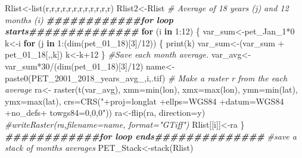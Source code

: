 \documentclass[
  10pt,
  b5paper,
]{book}
\newenvironment{Shaded}{\begin{snugshade}}{\end{snugshade}}
\newcommand{\AttributeTok}[1]{\textcolor[rgb]{0.77,0.63,0.00}{#1}}
\newcommand{\CommentTok}[1]{\textcolor[rgb]{0.56,0.35,0.01}{\textit{#1}}}
\newcommand{\ControlFlowTok}[1]{\textcolor[rgb]{0.13,0.29,0.53}{\textbf{#1}}}
\newcommand{\DecValTok}[1]{\textcolor[rgb]{0.00,0.00,0.81}{#1}}
\newcommand{\DocumentationTok}[1]{\textcolor[rgb]{0.56,0.35,0.01}{\textbf{\textit{#1}}}}
\newcommand{\FunctionTok}[1]{\textcolor[rgb]{0.00,0.00,0.00}{#1}}
\newcommand{\NormalTok}[1]{#1}
\newcommand{\OtherTok}[1]{\textcolor[rgb]{0.56,0.35,0.01}{#1}}
\newcommand{\SpecialCharTok}[1]{\textcolor[rgb]{0.00,0.00,0.00}{#1}}
\newcommand{\StringTok}[1]{\textcolor[rgb]{0.31,0.60,0.02}{#1}}
\begin{document}
\begin{Shaded}
\begin{Highlighting}[]
\NormalTok{Rlist}\OtherTok{\textless{}{-}}\FunctionTok{list}\NormalTok{(r,r,r,r,r,r,r,r,r,r,r,r)}
\NormalTok{Rlist2}\OtherTok{\textless{}{-}}\NormalTok{Rlist}
 \CommentTok{\# Average of 18 years (j)  and 12 months (i) }
\DocumentationTok{\#\#\#\#\#\#\#\#\#\#\#\#for loop starts\#\#\#\#\#\#\#\#\#\#\#\#\#\#}
 \ControlFlowTok{for}\NormalTok{ (i }\ControlFlowTok{in} \DecValTok{1}\SpecialCharTok{:}\DecValTok{12}\NormalTok{) \{ }
\NormalTok{var\_sum}\OtherTok{\textless{}{-}}\NormalTok{pet\_Jan\_1}\SpecialCharTok{*}\DecValTok{0}
\NormalTok{k}\OtherTok{\textless{}{-}}\NormalTok{i}
 \ControlFlowTok{for}\NormalTok{ (j }\ControlFlowTok{in} \DecValTok{1}\SpecialCharTok{:}\NormalTok{(}\FunctionTok{dim}\NormalTok{(pet\_01\_18)[}\DecValTok{3}\NormalTok{]}\SpecialCharTok{/}\DecValTok{12}\NormalTok{)) \{}
\FunctionTok{print}\NormalTok{(k)}
\NormalTok{var\_sum}\OtherTok{\textless{}{-}}\NormalTok{(var\_sum }\SpecialCharTok{+}\NormalTok{ pet\_01\_18[,,k])}
\NormalTok{ k}\OtherTok{\textless{}{-}}\NormalTok{k}\SpecialCharTok{+}\DecValTok{12}
\NormalTok{ \}}
\CommentTok{\#Save each month average. }
\NormalTok{ var\_avg}\OtherTok{\textless{}{-}}\NormalTok{var\_sum}\SpecialCharTok{*}\DecValTok{30}\SpecialCharTok{/}\NormalTok{(}\FunctionTok{dim}\NormalTok{(pet\_01\_18)[}\DecValTok{3}\NormalTok{]}\SpecialCharTok{/}\DecValTok{12}\NormalTok{)}
\NormalTok{name}\OtherTok{\textless{}{-}}\FunctionTok{paste0}\NormalTok{(}\StringTok{\textquotesingle{}PET\_2001\_2018\_years\_avg\_\textquotesingle{}}\NormalTok{,i,}\StringTok{\textquotesingle{}.tif\textquotesingle{}}\NormalTok{)}
 \CommentTok{\# Make a raster r from the each average}
\NormalTok{ra}\OtherTok{\textless{}{-}} \FunctionTok{raster}\NormalTok{(}\FunctionTok{t}\NormalTok{(var\_avg), }\AttributeTok{xmn=}\FunctionTok{min}\NormalTok{(lon), }\AttributeTok{xmx=}\FunctionTok{max}\NormalTok{(lon), }\AttributeTok{ymn=}\FunctionTok{min}\NormalTok{(lat), }\AttributeTok{ymx=}\FunctionTok{max}\NormalTok{(lat), }\AttributeTok{crs=}\FunctionTok{CRS}\NormalTok{(}\StringTok{"+proj=longlat +ellps=WGS84 +datum=WGS84 +no\_defs+ towgs84=0,0,0"}\NormalTok{))}
\NormalTok{ra}\OtherTok{\textless{}{-}}\FunctionTok{flip}\NormalTok{(ra, }\AttributeTok{direction=}\StringTok{\textquotesingle{}y\textquotesingle{}}\NormalTok{)}
\CommentTok{\#writeRaster(ra,filename=name, format="GTiff")}
\NormalTok{Rlist[[i]]}\OtherTok{\textless{}{-}}\NormalTok{ra}
\NormalTok{\}}
\DocumentationTok{\#\#\#\#\#\#\#\#\#\#\#\#for loop ends\#\#\#\#\#\#\#\#\#\#\#\#\#\#}
 \CommentTok{\#save a stack of months averages}
\NormalTok{ PET\_Stack}\OtherTok{\textless{}{-}}\FunctionTok{stack}\NormalTok{(Rlist)}

\end{Highlighting}
\end{Shaded}
\end{document}
